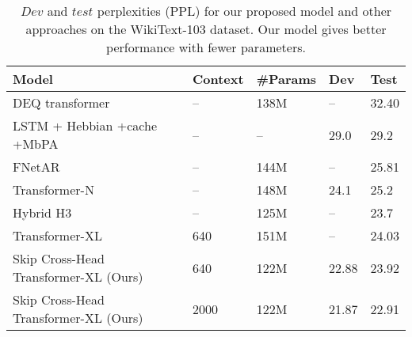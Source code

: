 \documentclass[11pt]{article}
\begin{document}
\begin{table*}
\centering
\begin{tabular}{lllll}
\hline
\textbf{Model} & \textbf{Context} & \textbf{\#Params} & \textbf{Dev} & \textbf{Test}\\
\hline

 DEQ transformer ~\citep{DBLP:conf/nips/BaiKK19} & -- & 138M & -- & 32.40  \\
 
LSTM + Hebbian +cache +MbPA ~\citep{DBLP:conf/icml/RaeDDL18} & -- & --  & 29.0 & 29.2  \\

FNetAR \citep{DBLP:journals/corr/abs-2107-10932} & -- & 144M & -- & 25.81 \\

Transformer-N \citep{DBLP:conf/naacl/SunI21} & -- & 148M &  24.1 & 25.2 \\

Hybrid H3 \citep{DBLP:journals/corr/abs-2212-14052} & -- & 125M & -- & 23.7 \\


\hline
 Transformer-XL~\citep{DBLP:conf/acl/DaiYYCLS19} & 640 & 151M  & --  & 24.03    \\
Skip Cross-Head Transformer-XL (Ours) & 640 & 122M & 22.88 & 23.92  \\
Skip Cross-Head Transformer-XL (Ours) & 2000 & 122M & 21.87  &  22.91 \\

\hline

\end{tabular}
\caption{
$Dev$ and $test$ perplexities (PPL) for our proposed model and other approaches on the WikiText-103 dataset. Our model gives better performance with fewer parameters.
}
\label{table:wt103}
\end{table*}
\end{document}
